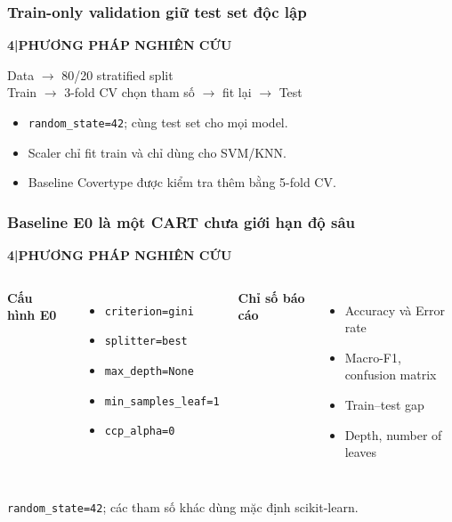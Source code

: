 \documentclass[aspectratio=169,12pt]{beamer}
\newcommand{\chaptertag}[2]{%
  \vspace{-0.16cm}%
  {\scriptsize\bfseries\textcolor{boxframe}{#1\enspace |\enspace #2}}\par
  \vspace{0.12cm}%
}
\begin{document}
\begin{frame}
  \frametitle{Train-only validation giữ test set độc lập}
  \chaptertag{4}{PHƯƠNG PHÁP NGHIÊN CỨU}
  \begin{tcolorbox}[focusbox,width=0.93\textwidth,top=4mm,bottom=4mm]
    \centering\large
    Data $\longrightarrow$ 80/20 stratified split\\[0.28cm]
    Train $\longrightarrow$ 3-fold CV chọn tham số $\longrightarrow$ fit lại $\longrightarrow$ Test
  \end{tcolorbox}
  \vspace{0.38cm}
  \begin{itemize}
    \item \texttt{random\_state=42}; cùng test set cho mọi model.
    \item Scaler chỉ fit train và chỉ dùng cho SVM/KNN.
    \item Baseline Covertype được kiểm tra thêm bằng 5-fold CV.
  \end{itemize}
\end{frame}

\begin{frame}
  \frametitle{Baseline E0 là một CART chưa giới hạn độ sâu}
  \chaptertag{4}{PHƯƠNG PHÁP NGHIÊN CỨU}
  \begin{columns}[T,onlytextwidth]
      \textbf{Cấu hình E0}
      \begin{itemize}
        \item \texttt{criterion=gini}
        \item \texttt{splitter=best}
        \item \texttt{max\_depth=None}
        \item \texttt{min\_samples\_leaf=1}
        \item \texttt{ccp\_alpha=0}
      \end{itemize}
      \textbf{Chỉ số báo cáo}
      \begin{itemize}
        \item Accuracy và Error rate
        \item Macro-F1, confusion matrix
        \item Train--test gap
        \item Depth, number of leaves
      \end{itemize}
  \end{columns}
  \vspace{0.22cm}
  \centering
  \texttt{random\_state=42}; các tham số khác dùng mặc định scikit-learn.
\end{frame}
\end{document}
